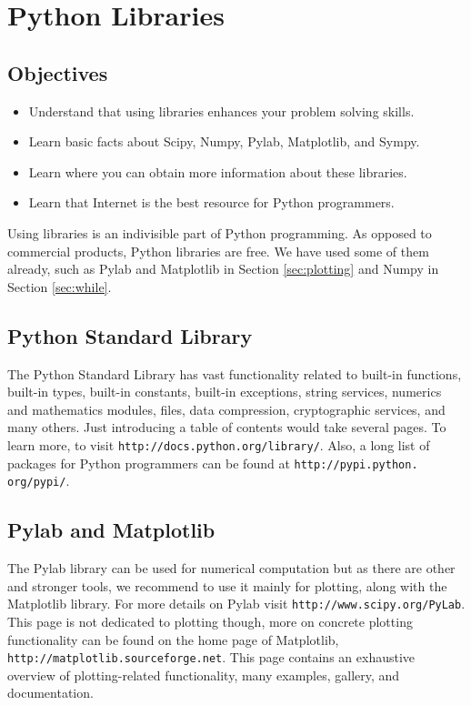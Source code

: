 \documentclass[article,A4,12pt]{llncs}
\begin{document}

\section{Python Libraries}\label{subsec:importinglib}

\subsection{Objectives}

\begin{itemize}
\item Understand that using libraries enhances your problem solving skills.
\item Learn basic facts about Scipy, Numpy, Pylab, Matplotlib, and Sympy.
\item Learn where you can obtain more information about these libraries.
\item Learn that Internet is the best resource for Python programmers.
\end{itemize}
Using libraries is an indivisible part of Python programming. As opposed to 
commercial products, Python libraries are free. We have used some of them
already, such as Pylab and Matplotlib in Section \ref{sec:plotting} and Numpy 
in Section \ref{sec:while}. 

\subsection{Python Standard Library}

The Python Standard Library has vast functionality related to 
built-in functions, built-in types, built-in constants, built-in
exceptions, string services, numerics and mathematics modules, files,
data compression, cryptographic services, and many others. Just introducing 
a table of contents would take several pages. To learn more,
to visit {\tt http://docs.python.org/library/}. Also, a long list of packages for Python 
programmers can be found at {\tt http://pypi.python. org/pypi/}.

\subsection{Pylab and Matplotlib}

The Pylab library can be used for numerical computation but as there are other 
and stronger tools, we recommend to use it mainly for plotting, along with the 
Matplotlib library. For more details on Pylab visit {\tt http://www.scipy.org/PyLab}.
This page is not dedicated to plotting though, more on concrete plotting functionality 
can be found on the home page of Matplotlib, {\tt http://matplotlib.sourceforge.net}.
This page contains an exhaustive overview of plotting-related functionality, many
examples, gallery, and documentation.
\end{document}
